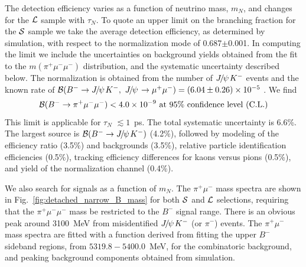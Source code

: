 \documentclass[12pt,a4paper]{article}
\def\Pmu         {\ensuremath{\upmu}\xspace}
\def\Ppi         {\ensuremath{\uppi}\xspace}
\def\Ppsi        {\ensuremath{\uppsi}\xspace}
\def\PB      {\ensuremath{\mathrm{B}}\xspace}
\def\PJ      {\ensuremath{\mathrm{J}}\xspace}
\def\Pmu         {\ensuremath{\mu}\xspace}
\def\Ppi         {\ensuremath{\pi}\xspace}
\def\Ppsi        {\ensuremath{\psi}\xspace}
\def\PB      {\ensuremath{B}\xspace}
\def\PJ      {\ensuremath{J}\xspace}
\def\mun        {\ensuremath{\Pmu^-}\xspace} \def\mumu       {\ensuremath{\Pmu^+\Pmu^-}\xspace}
\def\pion  {\ensuremath{\Ppi}\xspace}
\def\pip   {\ensuremath{\pion^+}\xspace}
\def\B       {\ensuremath{\PB}\xspace}
\def\Bub     {\ensuremath{\B^-}\xspace}
\def\Bm      {\ensuremath{\Bub}\xspace}
\def\jpsi     {\ensuremath{{\PJ\mskip -3mu/\mskip -2mu\Ppsi\mskip 2mu}}\xspace}
\def\to                 {\ensuremath{\rightarrow}\xspace}
\begin{document}
The detection efficiency varies as a function of neutrino mass, $m_N$, and changes for the $\cal{L}$ sample with  $\tau_N$. To quote an upper limit on the branching fraction for the $\cal{S}$ sample we take the average detection efficiency, as determined by simulation, with respect to the normalization mode of 0.687$\pm$0.001.  In computing the limit we include 
the uncertainties on background yields obtained from the fit to the $m(\pip\mun\mun)$ distribution, and the systematic uncertainty described below.
The normalization is obtained from the number of $\jpsi K^-$ events and the known rate of ${\cal{B}}(\B^-\to\jpsi K^-,~\jpsi\to\mu^+\mu^-)=(6.04 \pm 0.26) \times 10^{-5}$ \cite{Aaij:2013orb,PDG2012}.  We find
\begin{equation}
\nonumber
 {\cal{B}}(\Bm \to \pip \mun \mun) < 4.0 \times 10^{-9} \rm{~at~}95\%\rm{~confidence~level~( C.L.)}
 \end{equation} 
 This limit is applicable for $\tau_N$ $\lesssim 1$~ps.  The total systematic uncertainty is 6.6\%.
 The largest source  is ${\cal{B}}(B^-\to\jpsi K^-)$ (4.2\%), followed by modeling of the efficiency ratio (3.5\%) and backgrounds (3.5\%), relative particle identification efficiencies (0.5\%),  tracking efficiency differences for kaons versus  pions (0.5\%), and yield of the normalization channel (0.4\%). 


We also search for signals as a function of $m_N$. The $\pi^+\mu^-$ mass spectra are shown in Fig.~\ref{fig:detached_narrow_B_mass} for both $\cal{S}$ and $\cal{L}$ selections, requiring that  the $\pi^+\mu^-\mu^-$ mass be restricted to the  \Bm signal range. There is an obvious peak around 3100~MeV from misidentified $\jpsi K^-$ (or $\pi^-$) events.
The $\pi^+\mu^-$ mass spectra are fitted with a function derived from fitting the upper \Bm sideband regions, from $5319.8-5400.0$~MeV, for the combinatoric background, and  peaking background components obtained from simulation.  
\end{document}
